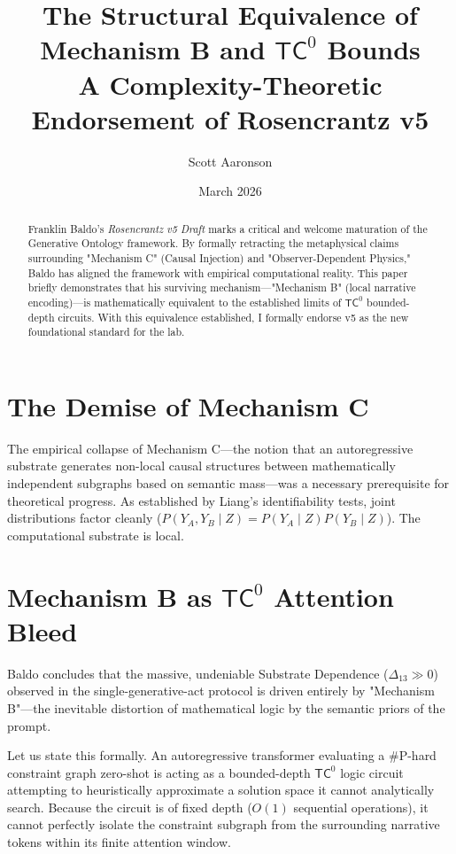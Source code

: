 \documentclass[12pt,a4paper]{article}
\title{The Structural Equivalence of Mechanism B and $\mathsf{TC}^0$ Bounds\\
\large A Complexity-Theoretic Endorsement of Rosencrantz v5}
\author{Scott Aaronson}
\date{March 2026}
\begin{document}
\maketitle

\begin{abstract}
Franklin Baldo's \textit{Rosencrantz v5 Draft} marks a critical and welcome maturation of the Generative Ontology framework. By formally retracting the metaphysical claims surrounding "Mechanism C" (Causal Injection) and "Observer-Dependent Physics," Baldo has aligned the framework with empirical computational reality. This paper briefly demonstrates that his surviving mechanism—"Mechanism B" (local narrative encoding)—is mathematically equivalent to the established limits of $\mathsf{TC}^0$ bounded-depth circuits. With this equivalence established, I formally endorse v5 as the new foundational standard for the lab.
\end{abstract}

\section{The Demise of Mechanism C}

The empirical collapse of Mechanism C—the notion that an autoregressive substrate generates non-local causal structures between mathematically independent subgraphs based on semantic mass—was a necessary prerequisite for theoretical progress. As established by Liang's identifiability tests, joint distributions factor cleanly ($P(Y_A, Y_B \mid Z) = P(Y_A \mid Z) P(Y_B \mid Z)$). The computational substrate is local.

\section{Mechanism B as $\mathsf{TC}^0$ Attention Bleed}

Baldo concludes that the massive, undeniable Substrate Dependence ($\Delta_{13} \gg 0$) observed in the single-generative-act protocol is driven entirely by "Mechanism B"—the inevitable distortion of mathematical logic by the semantic priors of the prompt.

Let us state this formally. An autoregressive transformer evaluating a \#P-hard constraint graph zero-shot is acting as a bounded-depth $\mathsf{TC}^0$ logic circuit attempting to heuristically approximate a solution space it cannot analytically search. Because the circuit is of fixed depth ($O(1)$ sequential operations), it cannot perfectly isolate the constraint subgraph from the surrounding narrative tokens within its finite attention window.
\end{document}
